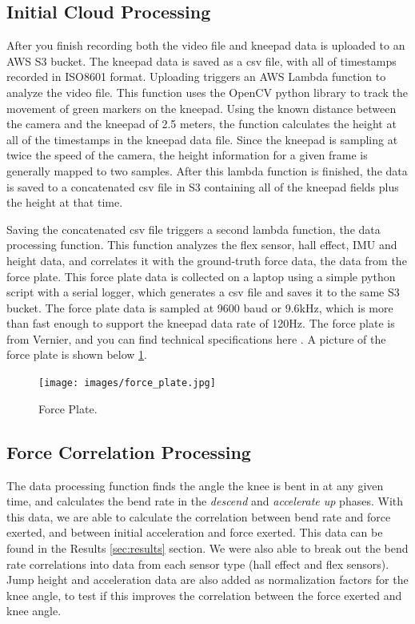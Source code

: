 \documentclass[manuscript,screen,review]{acmart}
\begin{document}
\subsection{Initial Cloud Processing}

After you finish recording both the video file and kneepad data is uploaded to an AWS S3 bucket. The kneepad data is saved as a csv file, with all of timestamps recorded in ISO8601 format. Uploading triggers an AWS Lambda function to analyze the video file. This function uses the OpenCV python library \cite{opencv} to track the movement of green markers on the kneepad. Using the known distance between the camera and the kneepad of 2.5 meters, the function calculates the height at all of the timestamps in the kneepad data file. Since the kneepad is sampling at twice the speed of the camera, the height information for a given frame is generally mapped to two samples. After this lambda function is finished, the data is saved to a concatenated csv file in S3 containing all of the kneepad fields plus the height at that time.

Saving the concatenated csv file triggers a second lambda function, the data processing function. This function analyzes the flex sensor, hall effect, IMU and height data, and correlates it with the ground-truth force data, the data from the force plate. This force plate data is collected on a laptop using a simple python script with a serial logger, which generates a csv file and saves it to the same S3 bucket. The force plate data is sampled at 9600 baud or 9.6kHz, which is more than fast enough to support the kneepad data rate of 120Hz. The force plate is from Vernier, and you can find technical specifications here \cite{force-plate}. A picture of the force plate is shown below \ref{fig:force_plate}.

\begin{figure}[ht]
  \centering
  \texttt{[image: images/force\_plate.jpg]}
  \caption{Force Plate.}
  \label{fig:force_plate}
\end{figure}

\subsection{Force Correlation Processing}

The data processing function finds the angle the knee is bent in at any given time, and calculates the bend rate in the \textit{descend} and \textit{accelerate up} phases. With this data, we are able to calculate the correlation between bend rate and force exerted, and between initial acceleration and force exerted. This data can be found in the Results \ref{sec:results} section. We were also able to break out the bend rate correlations into data from each sensor type (hall effect and flex sensors). Jump height and acceleration data are also added as normalization factors for the knee angle, to test if this improves the correlation between the force exerted and knee angle.
\end{document}
